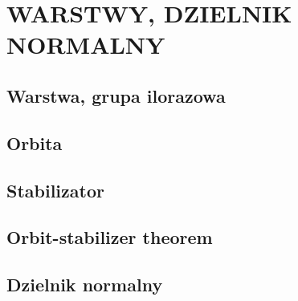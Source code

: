 \section{WARSTWY, DZIELNIK NORMALNY}

\subsection{Warstwa, grupa ilorazowa}

\subsection{Orbita}

\subsection{Stabilizator}

\subsection{Orbit-stabilizer theorem}

\subsection{Dzielnik normalny}
